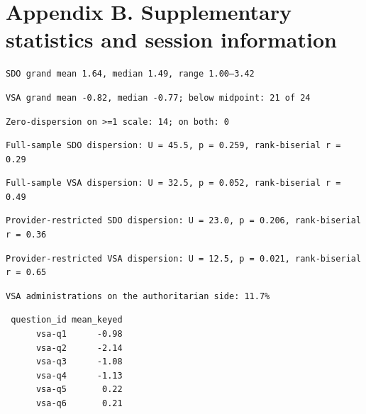 \documentclass[
]{article}
\begin{document}
\section*{Appendix B. Supplementary statistics and session
information}\label{appendix-b.-supplementary-statistics-and-session-information}

\begin{verbatim}
SDO grand mean 1.64, median 1.49, range 1.00–3.42
\end{verbatim}

\begin{verbatim}
VSA grand mean -0.82, median -0.77; below midpoint: 21 of 24
\end{verbatim}

\begin{verbatim}
Zero-dispersion on >=1 scale: 14; on both: 0
\end{verbatim}

\begin{verbatim}
Full-sample SDO dispersion: U = 45.5, p = 0.259, rank-biserial r = 0.29
\end{verbatim}

\begin{verbatim}
Full-sample VSA dispersion: U = 32.5, p = 0.052, rank-biserial r = 0.49
\end{verbatim}

\begin{verbatim}
Provider-restricted SDO dispersion: U = 23.0, p = 0.206, rank-biserial r = 0.36
\end{verbatim}

\begin{verbatim}
Provider-restricted VSA dispersion: U = 12.5, p = 0.021, rank-biserial r = 0.65
\end{verbatim}

\begin{verbatim}
VSA administrations on the authoritarian side: 11.7%
\end{verbatim}

\begin{verbatim}
 question_id mean_keyed
      vsa-q1      -0.98
      vsa-q2      -2.14
      vsa-q3      -1.08
      vsa-q4      -1.13
      vsa-q5       0.22
      vsa-q6       0.21
\end{verbatim}
\end{document}
